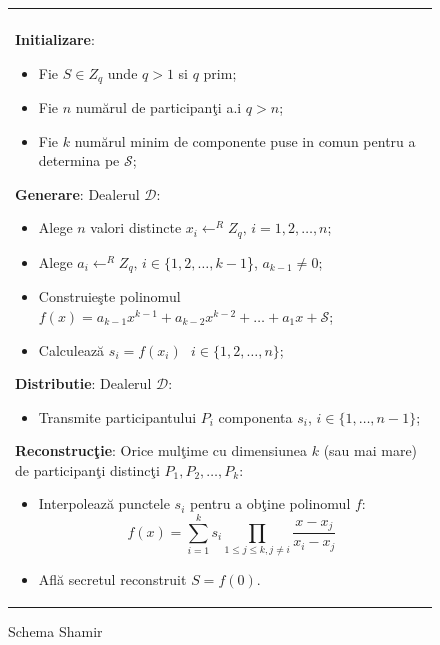 \documentclass{llncs}
\begin{document}
\begin{figure}[h!]

\begin{tabular}{|p{\textwidth}|}
\hline

\\
\hspace{.1in}
\textbf{Initializare}: 
	\begin{itemize}
		\item Fie $S \in Z_q$ unde $q > 1 $ si $q$ prim;
		\item Fie $n$ num\u{a}rul de participan\c{t}i a.i $q > n$;
		\item Fie $k$ num\u{a}rul minim de componente puse in comun pentru a determina pe $\mathcal{S}$;
	\end{itemize}
\medskip

\hspace{.1in}
\textbf{Generare}: Dealerul $\mathcal{D}$:
	\begin{itemize}
		\item Alege $n$ valori distincte $x_i \leftarrow^R Z_q \text{, }i = 1,2,\dots,n$;
		\item Alege $a_{i} \leftarrow^R Z_q \text{, }i \in \{1,2,\dots,{k - 1}$\}, $a_{k-1} \neq 0$;
		\item Construie\c{s}te polinomul $f(x) = a_{k - 1}x ^ {k-1} + a_{k-2}x ^ {k - 2} + \dots + a_1x + \mathcal{S}$;
		\item Calculeaz\u{a} $s_i = f(x_i) \text{ } i \in \{1,2,\dots,n\}$;
	\end{itemize}
\medskip

\hspace{.1in}
\textbf{Distributie}: Dealerul $\mathcal{D}$:
	\begin{itemize}
		\item Transmite participantului $P_i$ componenta $s_i$, $i \in \{1,\dots,n-1\}$;
	\end{itemize}

\hspace{.1in}
\textbf{Reconstruc\c{t}ie}: Orice mul\c{t}ime cu dimensiunea $k$ (sau mai mare) de participan\c{t}i distinc\c{t}i $P_1, P_2, \dots, P_k$:
	\begin{itemize}
		\setlength{\itemsep}{5pt}
		\item Interpoleaz\u{a} punctele $s_i$ pentru a ob\c{t}ine polinomul $f$:
		\begin{equation} f(x)=\sum_{i=1}^{k} {s_i}\prod_{1 \leq j \leq k, j \neq i} \frac{x-x_j}{x_i-x_j} \end{equation}
		\item Afl\u{a} secretul reconstruit $S = f(0)$.
	\end{itemize}

\\
\hline
\end{tabular}

\caption{Schema Shamir \cite{S:1979}}
\label{fig:shamir_scheme}
\end{figure}
\end{document}
